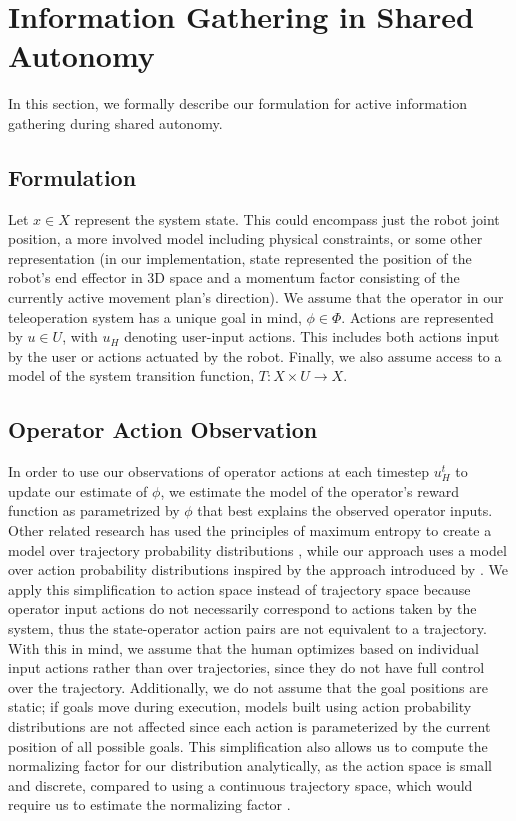 \documentclass[conference]{IEEEtran}
\begin{document}
\section{Information Gathering in Shared Autonomy}

In this section, we formally describe our formulation for active information gathering during shared autonomy.

\subsection{Formulation}

Let $ x \in X $ represent the system state. This could encompass just the robot joint position, a more involved model including physical constraints, or some other representation (in our implementation, state represented the position of the robot's end effector in 3D space and a momentum factor consisting of the currently active movement plan's direction). We assume that the operator in our teleoperation system has a unique goal in mind, $\phi \in \Phi$. Actions are represented by $ u \in U $, with $u_H$ denoting user-input actions. This includes both actions input by the user or actions actuated by the robot. Finally, we also assume access to a model of the system transition function, $T: X \times U \rightarrow X$.

\subsection{Operator Action Observation}
In order to use our observations of operator actions at each timestep $u_H^t$ to update our estimate of $\phi$, we estimate the model of the operator's reward function as parametrized by $\phi$ that best explains the observed operator inputs. Other related research has used the principles of maximum entropy \cite{ziebart2008maximum} to create a model over trajectory probability distributions \cite{dragan2012formalizing, javdani2015shared}, while our approach uses a model over action probability distributions inspired by the approach introduced by  \citet{ramachandran2007bayesian}. We apply this simplification to action space instead of trajectory space because operator input actions do not necessarily correspond to actions taken by the system, thus the state-operator action pairs are not equivalent to a trajectory. With this in mind, we assume that the human optimizes based on individual input actions rather than over trajectories, since they do not have full control over the trajectory. Additionally, we do not assume that the goal positions are static; if goals move during execution, models built using action probability distributions are not affected since each action is parameterized by the current position of all possible goals. This simplification also allows us to compute the normalizing factor for our distribution analytically, as the action space is small and discrete, compared to using a continuous trajectory space, which would require us to estimate the normalizing factor \cite{javdani2015shared}.
\end{document}
